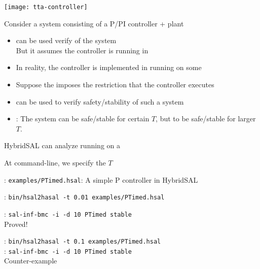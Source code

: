 \documentclass{seminar}
\begin{document}
\begin{slide}

\begin{center}
\texttt{[image: tta-controller]}
\end{center}

\end{slide}
\begin{slide}

Consider a system consisting of a P/PI controller + plant

\begin{itemize}
\item
 {} can be used verify {} of the system
 \\
 But it assumes the controller is running in {}

\item
 In reality, the controller is implemented in {} running
 on some {}

\item
 Suppose the {} imposes the restriction that the controller
 executes {}

\item
 {} can be used to 
 verify safety/stability of such a system

\item
 {}:  The system can be safe/stable for certain
 $T$, but {} to be safe/stable for larger $T$.

\end{itemize}


\end{slide}
\begin{slide}

HybridSAL can analyze {} running on a 
{}

At command-line, we specify the {} $T$


\bigskip
{}: {\tt{examples/PTimed.hsal}}: A simple P controller in HybridSAL

{}: {\tt{bin/hsal2hasal -t 0.01 examples/PTimed.hsal}}

{}: {\tt{sal-inf-bmc -i -d 10 PTimed stable}} 
\\
Proved!

{}: {\tt{bin/hsal2hasal -t 0.1 examples/PTimed.hsal}}
\\
{}: {\tt{sal-inf-bmc -i -d 10 PTimed stable}} 
\\
Counter-example

\end{slide}
\end{document}
